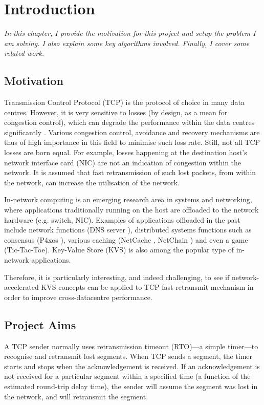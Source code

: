 \chapter{Introduction}
\textit{In this chapter, I provide the motivation for this project and setup the problem I am solving. I also explain some key algorithms involved. Finally, I cover some related work.}

\section{Motivation}
Transmission Control Protocol (TCP) is the protocol of choice in many data centres. However, it is very sensitive to losses (by design, as a mean for congestion control), which can degrade the performance within the data centres significantly \cite{zilberman2017has}. Various congestion control, avoidance and recovery mechanisms are thus of high importance in this field to minimise such loss rate. Still, not all TCP losses are born equal. For example, losses happening at the destination host's network interface card (NIC) are not an indication of congestion within the network. It is assumed that fast retransmission of such lost packets, from within the network, can increase the utilisation of the network.

In-network computing is an emerging research area in systems and networking, where applications traditionally running on the host are offloaded to the network hardware (e.g. switch, NIC). Examples of applications offloaded in the past include network functions (DNS server \cite{dns}), distributed systems functions such as consensus (P4xos \cite{p4xos}), various caching (NetCache \cite{netCache}, NetChain \cite{netChain}) and even a game (Tic-Tac-Toe). Key-Value Store (KVS) is also among the popular type of in-network applications. 

Therefore, it is particularly interesting, and indeed challenging, to see if network-accelerated KVS concepts can be applied to TCP fast retransmit mechanism in order to improve cross-datacentre performance.
 
\section{Project Aims}
A TCP sender normally uses retransmission timeout (RTO)---a simple timer---to recognise and retransmit lost segments. When TCP sends a segment, the timer starts and stops when the acknowledgement is received. If an acknowledgement is not received for a particular segment within a specified time (a function of the estimated round-trip delay time), the sender will assume the segment was lost in the network, and will retransmit the segment.

